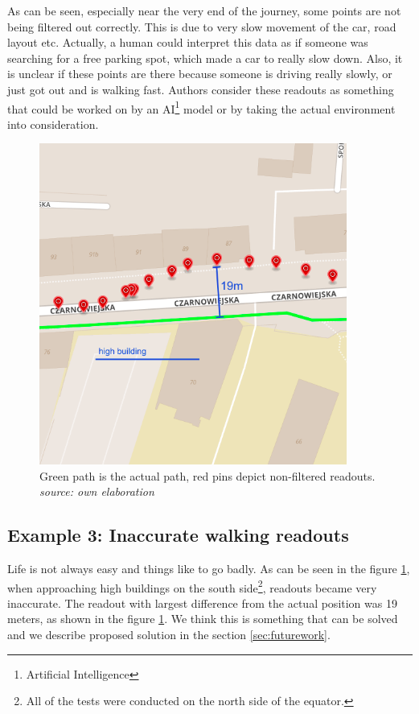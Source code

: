As can be seen, especially near the very end of the journey, some points are not being filtered out correctly. This is due to very slow movement of the car, road layout etc. Actually, a human could interpret this data as if someone was searching for a free parking spot, which made a car to really slow down. Also, it is unclear if these points are there because someone is driving really slowly, or just got out and is walking fast. Authors consider these readouts as something that could be worked on by an AI\footnote{Artificial Intelligence} model or by taking the actual environment into consideration.

\begin{figure}[]
    \includegraphics[width=0.9\textwidth]{images/3.png}
    \caption{Green path is the actual path, red pins depict non-filtered readouts. \\ \textit{source: own elaboration}}
    \label{fig:screenexample3}
\end{figure}

\subsection{Example 3: Inaccurate walking readouts} \label{sec:inaccuratereadoutsexample}

Life is not always easy and things like to go badly. As can be seen in the figure \ref{fig:screenexample3}, when approaching high buildings on the south side\footnote{All of the tests were conducted on the north side of the equator.}, readouts became very inaccurate. The readout with largest difference from the actual position was 19 meters, as shown in the figure \ref{fig:screenexample3}. We think this is something that can be solved and we describe proposed solution in the section \ref{sec:futurework}.
